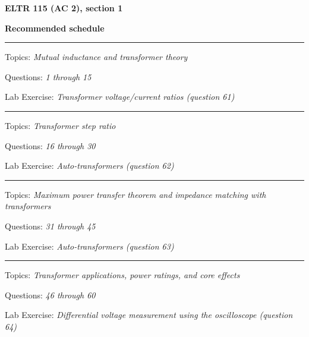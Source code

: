 
\centerline{\bf ELTR 115 (AC 2), section 1} \bigskip 
 
\vskip 10pt

\noindent
{\bf Recommended schedule}

\vskip 5pt

\hrule \vskip 5pt
\noindent
{}

\hskip 10pt Topics: {\it Mutual inductance and transformer theory}
 
\hskip 10pt Questions: {\it 1 through 15}
 
\hskip 10pt Lab Exercise: {\it Transformer voltage/current ratios (question 61)}
 


\vskip 10pt
\hrule \vskip 5pt
\noindent
{}

\hskip 10pt Topics: {\it Transformer step ratio}
 
\hskip 10pt Questions: {\it 16 through 30}
 
\hskip 10pt Lab Exercise: {\it Auto-transformers (question 62)}
 



\vskip 10pt
\hrule \vskip 5pt
\noindent
{}

\hskip 10pt Topics: {\it Maximum power transfer theorem and impedance matching with transformers}
 
\hskip 10pt Questions: {\it 31 through 45}
 
\hskip 10pt Lab Exercise: {\it Auto-transformers (question 63)}
 
\vskip 10pt
\hrule \vskip 5pt
\noindent
{}

\hskip 10pt Topics: {\it Transformer applications, power ratings, and core effects}
 
\hskip 10pt Questions: {\it 46 through 60}
 
\hskip 10pt Lab Exercise: {\it Differential voltage measurement using the oscilloscope (question 64)}
 
